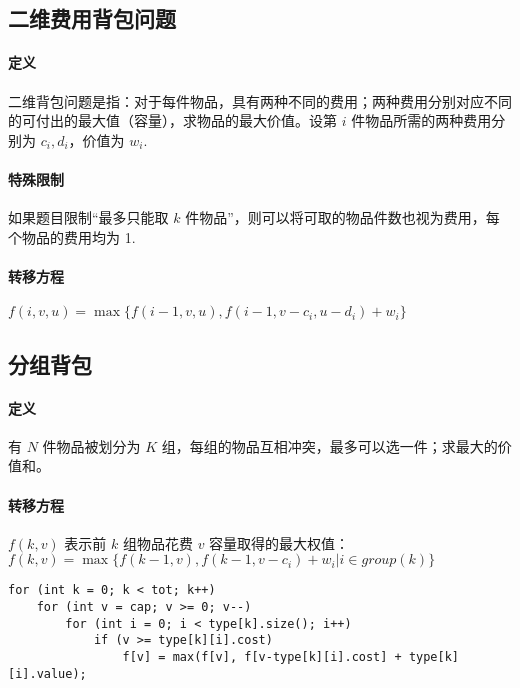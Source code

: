 \subsection{二维费用背包问题}

\paragraph{定义} 二维背包问题是指：对于每件物品，具有两种不同的费用；两种费用分别对应不同的可付出的最大值（容量），求物品的最大价值。设第 $i$ 件物品所需的两种费用分别为 $c_i, d_i$，价值为 $w_i$.
\paragraph{特殊限制} 如果题目限制“最多只能取 $k$ 件物品”，则可以将可取的物品件数也视为费用，每个物品的费用均为 1.
\paragraph{转移方程} $f(i, v, u) = \max\{f(i-1, v, u), f(i-1, v-c_i, u-d_i) + w_i\}$

\subsection{分组背包}
\paragraph{定义} 有 $N$ 件物品被划分为 $K$ 组，每组的物品互相冲突，最多可以选一件；求最大的价值和。
\paragraph{转移方程} $f(k, v)$ 表示前 $k$ 组物品花费 $v$ 容量取得的最大权值：$f(k, v) = \max\{ f(k-1, v), f(k-1, v-c_i) + w_i | i \in group(k) \}$
\begin{verbatim}
for (int k = 0; k < tot; k++)
    for (int v = cap; v >= 0; v--)
        for (int i = 0; i < type[k].size(); i++)
            if (v >= type[k][i].cost)
                f[v] = max(f[v], f[v-type[k][i].cost] + type[k][i].value);
\end{verbatim}

\clearpage